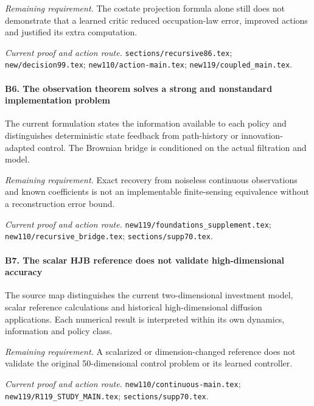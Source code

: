 \par\emph{Remaining requirement.} The costate projection formula alone still does not demonstrate that a learned critic reduced occupation-law error, improved actions and justified its extra computation.

\par\emph{Current proof and action route.} \nolinkurl{sections/recursive86.tex}; \nolinkurl{new/decision99.tex}; \nolinkurl{new110/action-main.tex}; \nolinkurl{new119/coupled_main.tex}.

\paragraph{B6. The observation theorem solves a strong and nonstandard implementation problem}

The current formulation states the information available to each policy and distinguishes deterministic state feedback from path-history or innovation-adapted control. The Brownian bridge is conditioned on the actual filtration and model.

\par\emph{Remaining requirement.} Exact recovery from noiseless continuous observations and known coefficients is not an implementable finite-sensing equivalence without a reconstruction error bound.

\par\emph{Current proof and action route.} \nolinkurl{new119/foundations_supplement.tex}; \nolinkurl{new110/recursive_bridge.tex}; \nolinkurl{sections/supp70.tex}.

\paragraph{B7. The scalar HJB reference does not validate high-dimensional accuracy}

The source map distinguishes the current two-dimensional investment model, scalar reference calculations and historical high-dimensional diffusion applications. Each numerical result is interpreted within its own dynamics, information and policy class.

\par\emph{Remaining requirement.} A scalarized or dimension-changed reference does not validate the original 50-dimensional control problem or its learned controller.

\par\emph{Current proof and action route.} \nolinkurl{new110/continuous-main.tex}; \nolinkurl{new119/R119_STUDY_MAIN.tex}; \nolinkurl{sections/supp70.tex}.

